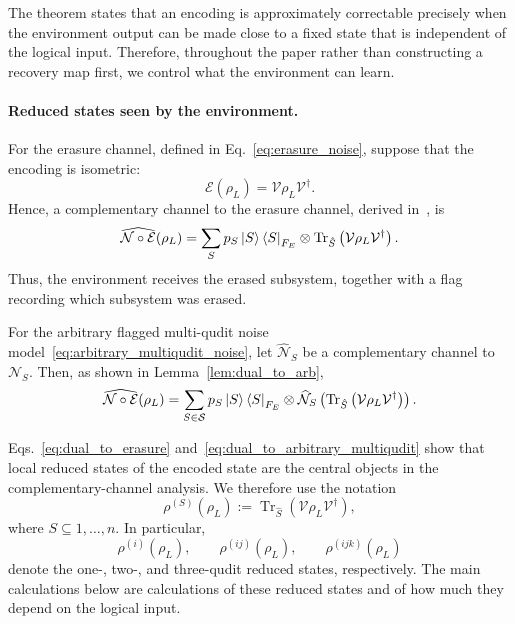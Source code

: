 \documentclass[10pt,twocolumn,superscriptaddress,aps,amsmath,amssymb,citeautoscript,floatfix,prx]{revtex4-2}
\theoremstyle{plain}
\theoremstyle{plain}
\theoremstyle{plain}
\theoremstyle{plain}
\theoremstyle{plain}
\theoremstyle{plain}
\theoremstyle{plain}
\theoremstyle{definition}
\theoremstyle{plain}
\begin{document}
The theorem states that an encoding is approximately correctable precisely when the environment output can be made close to a fixed state that is independent of the logical input. 
Therefore, throughout the paper rather than constructing a recovery map first, we control what the environment can learn.

\paragraph{Reduced states seen by the environment.}

For the erasure channel, defined in Eq.~\eqref{eq:erasure_noise}, suppose that the encoding is isometric:
\begin{equation}\label{eq:enc_isom}
\mathcal E(\rho_L)
=
\mathcal{V}\rho_L\mathcal{V}^\dagger .
\end{equation}
Hence, a complementary channel to the erasure channel, derived in~\cite{Faist2020}, is
\begin{equation}\label{eq:dual_to_erasure}
\widehat{\mathcal N\circ\mathcal E}(\rho_L)
=
\sum_S
p_S
\ket S\bra S_{F_E}
\otimes
\operatorname{Tr}_{\hat S}
\left(
\mathcal{V}\rho_L\mathcal{V}^\dagger
\right).
\end{equation}
Thus, the environment receives the erased subsystem, together with a flag recording which subsystem was erased.

For the arbitrary flagged multi-qudit noise model~\eqref{eq:arbitrary_multiqudit_noise}, let $\widehat{\mathcal N}_S$ be a complementary channel to $\mathcal N_S$. 
Then, as shown in Lemma~\ref{lem:dual_to_arb},
\begin{equation}\label{eq:dual_to_arbitrary_multiqudit}
\widehat{\mathcal N\circ\mathcal E}(\rho_L)
=
\sum_{S\in\mathcal S}
p_S
\ket S\bra S_{F_E}
\otimes
\widehat{\mathcal N}_S
\left(
\operatorname{Tr}_{\hat S}
\left(
\mathcal{V}\rho_L\mathcal{V}^\dagger
\right)
\right).
\end{equation}

Eqs.~\eqref{eq:dual_to_erasure} and~\eqref{eq:dual_to_arbitrary_multiqudit} show that local reduced states of the encoded state are the central objects in the complementary-channel analysis. 
We therefore use the notation
\begin{equation}\label{eq:reduced_state}
\rho^{(S)}(\rho_L)
:=
\operatorname{Tr}_{\hat S}
\left(
\mathcal{V}\rho_L\mathcal{V}^\dagger
\right),
\end{equation}
where $S\subseteq{1,\ldots,n}$. In particular,
$$
\rho^{(i)}(\rho_L),
\qquad
\rho^{(ij)}(\rho_L),
\qquad
\rho^{(ijk)}(\rho_L)
$$
denote the one-, two-, and three-qudit reduced states, respectively. The main calculations below are calculations of these 
reduced states and of how much they depend on the logical input.
\end{document}

